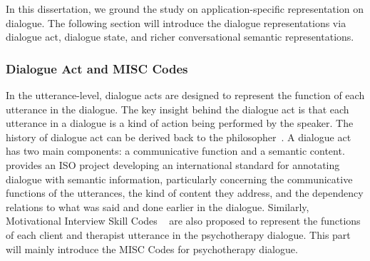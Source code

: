 In this dissertation, we ground the study on application-specific
representation on dialogue. The following section will introduce the
dialogue representations via dialogue act, dialogue state, and richer
conversational semantic representations.

\subsubsection{Dialogue Act and MISC Codes}
\label{sssec:bg:dialogue-act}
In the utterance-level, dialogue acts are designed to represent the
function of each utterance in the dialogue. The key insight behind the
dialogue act is that each utterance in a dialogue is a kind of action
being performed by the speaker. The history of dialogue act can be
derived back to the philosopher~\citet{wittgenstein2010philosophical}.
A dialogue act has two main components: a communicative function and a
semantic content. \citet{bunt2010towards} provides an ISO project
developing an international standard for annotating dialogue with
semantic information, particularly concerning the communicative
functions of the utterances, the kind of content they address, and the
dependency relations to what was said and done earlier in the
dialogue. Similarly, Motivational Interview Skill Codes
~\cite[MISC,][]{miller2003motivational,miller2012motivational} are
also proposed to represent the functions of each client and therapist
utterance in the psychotherapy dialogue. This part will mainly
introduce the MISC Codes for psychotherapy dialogue.

